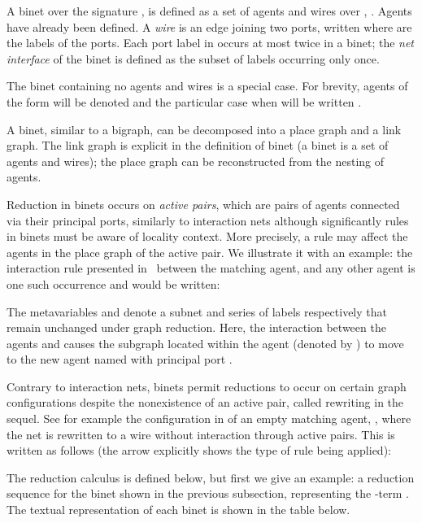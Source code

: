 \documentclass[copyright,creativecommons]{eptcs}
\begin{document}
\begin{definition}[Binet]
A binet over the signature ,  is defined as a set of
agents and wires over , . Agents have already been
defined. A \emph{wire} is an edge joining two ports, written 
where  are the labels of the ports.  Each port label in 
occurs at most twice in a binet; the \emph{net interface} of the binet
is defined as the subset of labels occurring only once.

The binet containing no
agents and wires is a special case.  For brevity, agents of the form
 will be denoted
 and the particular case when 
will be written .
\end{definition}

 A binet, similar to a bigraph, can be decomposed into a place
graph and a link graph. The link graph is explicit in the definition of
binet (a binet is a set of agents and wires); the place graph can 
be reconstructed from the nesting of agents.

Reduction in binets occurs on \emph{active pairs}, which are pairs of
agents connected via their principal ports, similarly to interaction
nets although significantly rules in binets must be aware of locality
context. More precisely, a rule may affect the agents in the place
graph of the active pair.  We illustrate it with an example:
the interaction rule presented in~\cite{EXPRESS} between the matching agent,
  and any other agent 
is one such occurrence and would be written:

The metavariables  and  denote a subnet and series of labels respectively
that remain unchanged under graph reduction.  Here, the interaction between the
agents  and  causes the subgraph located within the agent  (denoted by ) to 
move to the new agent named  with principal port .

Contrary to interaction nets, binets permit reductions to occur on certain 
graph configurations despite the nonexistence of an active pair, called 
 rewriting in the sequel. See for example the 
configuration in \cite{EXPRESS} of an empty matching agent, , where the net is rewritten to a wire without interaction through active pairs.
This is written as follows (the arrow explicitly shows the type 
of rule being applied):


The reduction calculus is defined below, but first we give an example:
a  reduction sequence for the binet shown in the
previous subsection, representing the -term . The textual representation of each binet is
shown in the table below.
\end{document}
